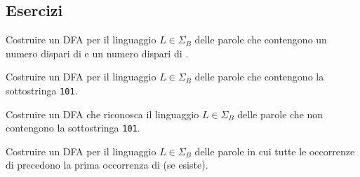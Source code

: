 \subsection*{Esercizi}

\begin{Exercise}\label{exe:1-dispari-0-dispari}
Costruire un DFA per il linguaggio $L\in\Sigma_{B}$ delle parole che contengono un numero dispari di \zero e un numero
dispari di \uno.
\end{Exercise}

\begin{Exercise}\label{exe:101-dfa}
Costruire un DFA per il linguaggio $L\in\Sigma_{B}$ delle parole che contengono la sottostringa \texttt{101}.
\end{Exercise}


\begin{Exercise}\label{exe:no-101-dfa}
Costruire un DFA che riconosca il linguaggio $L\in\Sigma_{B}$ delle parole che non contengono la sottostringa \texttt{101}.
\end{Exercise}

\begin{Answer}

\end{Answer}



\begin{Exercise}\label{exe:1100-dfa}
Costruire un DFA per il linguaggio $L\in\Sigma_{B}$ delle parole in cui tutte le occorrenze di \uno\uno precedono la
prima occorrenza di \zero\zero (se esiste).
\end{Exercise}


